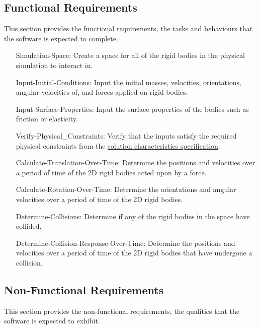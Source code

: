 \documentclass[12pt]{article}
\begin{document}
\subsection{Functional Requirements}
\label{Sec:FRs}
This section provides the functional requirements, the tasks and behaviours that the software is expected to complete.

\begin{itemize}
\item[Simulation-Space:\phantomsection\label{simSpace}]{Create a space for all of the rigid bodies in the physical simulation to interact in.}
\item[Input-Initial-Conditions:\phantomsection\label{inputInitialConds}]{Input the initial masses, velocities, orientations, angular velocities of, and forces applied on rigid bodies.}
\item[Input-Surface-Properties:\phantomsection\label{inputSurfaceProps}]{Input the surface properties of the bodies such as friction or elasticity.}
\item[Verify-Physical\_Constraints:\phantomsection\label{verifyPhysCons}]{Verify that the inputs satisfy the required physical constraints from the \hyperref[Sec:SolCharSpec]{solution characteristics specification}.}
\item[Calculate-Translation-Over-Time:\phantomsection\label{calcTransOverTime}]{Determine the positions and velocities over a period of time of the 2D rigid bodies acted upon by a force.}
\item[Calculate-Rotation-Over-Time:\phantomsection\label{calcRotOverTime}]{Determine the orientations and angular velocities over a period of time of the 2D rigid bodies.}
\item[Determine-Collisions:\phantomsection\label{deterColls}]{Determine if any of the rigid bodies in the space have collided.}
\item[Determine-Collision-Response-Over-Time:\phantomsection\label{deterCollRespOverTime}]{Determine the positions and velocities over a period of time of the 2D rigid bodies that have undergone a collision.}
\end{itemize}
\subsection{Non-Functional Requirements}
\label{Sec:NFRs}
This section provides the non-functional requirements, the qualities that the software is expected to exhibit.
\end{document}
